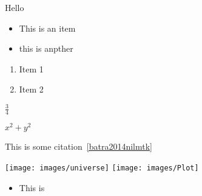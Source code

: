 \documentclass{article}
\begin{document}
Hello

\begin{itemize}
    \item This is an item
    \item this is anpther 
\end{itemize}

\begin{enumerate}
    \item Item 1
    \item Item 2
    
\end{enumerate}

$\frac{3}{4}$


$x^2+y^2$

This is some citation~\ref{batra2014nilmtk}



\texttt{[image: images/universe]}
\texttt{[image: images/Plot]}



\begin{itemize}
    \item This is
\end{itemize}
\end{document}
